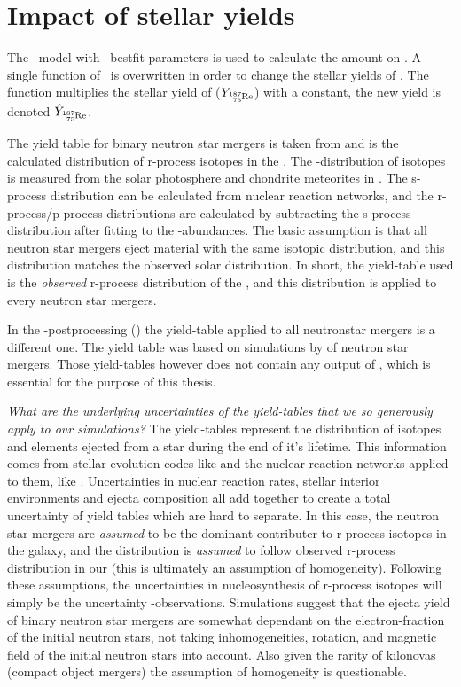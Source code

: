 \FloatBarrier

\section{Impact of stellar yields}
The \omegamodel\ model with \eris\ bestfit parameters is used to calculate the amount on .
A single function of \omegamodel\ is overwritten in order to change the stellar yields of .
The function multiplies the stellar yield of  ($Y_\re{187}$) with a constant, the new yield is denoted $\hat{Y}_\re{187}$.

The yield table for binary neutron star mergers is taken from \cite{arnould07} and is the calculated distribution of r-process isotopes in the \sos.
The \sos-distribution of isotopes is measured from the solar photosphere and chondrite meteorites in \cite{landolt93}.
The s-process distribution can be calculated from nuclear reaction networks, and the r-process/p-process distributions are calculated by subtracting the s-process distribution after fitting to the \sos-abundances.
The basic assumption is that all neutron star mergers eject material with the same isotopic distribution, and this distribution matches the observed solar distribution.
In short, the yield-table used is the \textit{observed} r-process distribution of the \sos, and this distribution is applied to every neutron star mergers.

In the \eris-postprocessing () the yield-table applied to all neutronstar mergers is a different one.
The yield table was based on simulations by  of neutron star mergers. Those yield-tables however does not contain any output of , which is essential for the purpose of this thesis.

\textit{What are the underlying uncertainties of the yield-tables that we so generously apply to our simulations?}
The yield-tables represent the distribution of isotopes and elements ejected from a star during the end of it's lifetime. This information comes from stellar evolution codes like \cite{paxton11} and the nuclear reaction networks applied to them, like \cite{pignatari16}.
Uncertainties in nuclear reaction rates, stellar interior environments and ejecta composition all add together to create a total uncertainty of yield tables which are hard to separate.
In this case, the neutron star mergers are \textit{assumed} to be the dominant contributer to r-process isotopes in the galaxy, and the distribution is \textit{assumed} to follow observed r-process distribution in our \sos (this is ultimately an assumption of homogeneity).
Following these assumptions, the uncertainties in nucleosynthesis of r-process isotopes will simply be the uncertainty \sos-observations\cite{arnould07}.
Simulations suggest that the ejecta yield of binary neutron star mergers are somewhat dependant on the electron-fraction of the initial neutron stars, not taking inhomogeneities, rotation, and magnetic field of the initial neutron stars into account. Also given the rarity of kilonovas (compact object mergers) the assumption of homogeneity is questionable.

